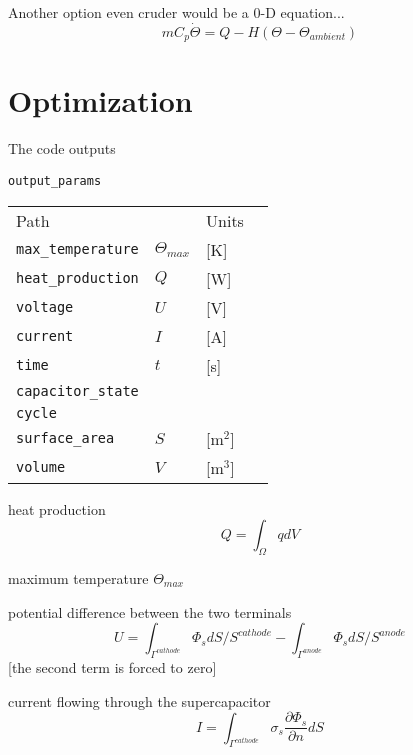 \documentclass[10pt, oneside]{article}   	%
\begin{document}
Another option even cruder would be a 0-D equation...
\begin{equation}
m C_p \dot{\Theta} = Q - H (\Theta - \Theta_{ambient})
\end{equation}

\newpage
\section{Optimization}

The code outputs

\texttt{output\_params} \\
{\footnotesize
\begin{tabular}{llll}
Path                      &     & Units \\
\texttt{max\_temperature} & $\Theta_{max}$ & [K] \\
\texttt{heat\_production} & $Q$ & [W] \\
\texttt{voltage}          & $U$ & [V] \\
\texttt{current}          & $I$ & [A] \\
\texttt{time}             & $t$ & [s] \\
\texttt{capacitor\_state} \\
\texttt{cycle}            \\
\texttt{surface\_area}    & $S$ & [m$^2$] \\
\texttt{volume}           & $V$ & [m$^3$] \\
\end{tabular}
}

heat production
\begin{equation}
Q = \int_\Omega q dV
\end{equation}

maximum temperature $\Theta_{max}$

potential difference between the two terminals
\begin{equation}
U = \int_{\Gamma^{cathode}} \Phi_s dS / S^{cathode} 
- \int_{\Gamma^{anode}} \Phi_s dS / S^{anode}
\end{equation}
[the second term is forced to zero]

current flowing through the supercapacitor
\begin{equation}
I = \int_{\Gamma^{cathode}} \sigma_s \frac{\partial \Phi_s}{\partial n} dS
\end{equation}
\end{document}
